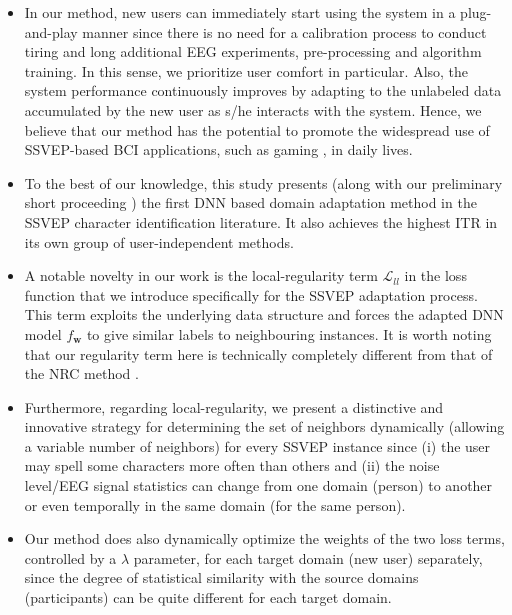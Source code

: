\documentclass[12pt]{iopart}
\newcommand{\matr}[1]{\mathbf{#1}}
\begin{document}
\begin{itemize}
    \item In our method, new users can immediately start using the system in a plug-and-play manner since there is no need for a calibration process to conduct tiring and long additional EEG experiments, pre-processing and algorithm training. {In this sense, we prioritize user comfort in particular}. Also, the system performance continuously improves by adapting to the unlabeled data accumulated by the new user as s/he interacts with the system. Hence, we believe that our method has the potential to promote the widespread use of SSVEP-based BCI applications, such as gaming \cite{gaming1}, in daily lives.
    
    \item To the best of our knowledge, this study presents (along with our preliminary short proceeding \cite{siu_adaptation}) the first DNN based domain adaptation method in the SSVEP character identification literature. It also achieves the highest ITR in its own group of user-independent methods.
    
    \item A notable novelty in our work is the local-regularity term $\mathcal{L}_{{ll}}$ in the loss function that we introduce specifically for the SSVEP adaptation process. This term exploits the underlying data structure and forces the adapted DNN model $f_\matr{w}$ to give similar labels to neighbouring instances. It is worth noting that our regularity term here is technically completely different from that of the NRC method \cite{affinity_sfda}.
    
    \item Furthermore, regarding local-regularity, we present a distinctive and innovative strategy for determining the set of neighbors dynamically (allowing a variable number of neighbors) for every SSVEP instance since (i) the user may spell some characters more often than others and (ii) the noise level/EEG signal statistics can change from one domain (person) to another or even temporally in the same domain (for the same person).
    
    \item Our method does also dynamically optimize the weights of the two loss terms, controlled by a $\lambda$ parameter, for each target domain (new user) separately, since the degree of statistical similarity with the source domains (participants) can be quite different for each target domain. 
\end{itemize}
\end{document}
